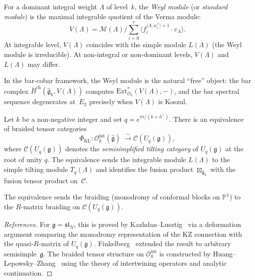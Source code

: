 \begin{definition}\label{def:weyl-module}
For a dominant integral weight $\Lambda$ of level~$k$, the
\emph{Weyl module} (or \emph{standard module}) is the maximal
integrable quotient of the Verma module:
\[
V(\Lambda) = \mathcal{M}(\Lambda) \Big/ \sum_{i=0}^r
\langle f_i^{\langle\Lambda, \alpha_i^\vee\rangle + 1}
\cdot v_\Lambda \rangle.
\]
At integrable level, $V(\Lambda)$ coincides with the simple module
$L(\Lambda)$ (the Weyl module is irreducible).  At non-integral or
non-dominant levels, $V(\Lambda)$ and $L(\Lambda)$ may differ.

In the bar-cobar framework, the Weyl module is the natural
``free'' object: the bar complex
$\bar{B}^{\mathrm{ch}}(\widehat{\mathfrak{g}}_k, V(\Lambda))$
computes $\mathrm{Ext}^*_{\mathcal{O}_k}(V(\Lambda), -)$, and the
bar spectral sequence degenerates at~$E_2$ precisely when
$V(\Lambda)$ is Koszul.
\end{definition}

\begin{theorem}
\label{thm:kazhdan-lusztig-equivalence}
Let $k$ be a non-negative integer and set
$q = e^{\pi i/(k + h^\vee)}$.  There is an equivalence of
braided tensor categories
\begin{equation}\label{eq:kl-equivalence}
\Phi_{\mathrm{KL}} \colon
\mathcal{O}_k^{\mathrm{int}}(\widehat{\mathfrak{g}})
\;\xrightarrow{\;\sim\;}
\mathcal{C}(U_q(\mathfrak{g})),
\end{equation}
where $\mathcal{C}(U_q(\mathfrak{g}))$ denotes the
\emph{semisimplified tilting category} of $U_q(\mathfrak{g})$
at the root of unity $q$.  The equivalence sends the integrable
module $L(\Lambda)$ to the simple tilting module
$T_q(\Lambda)$ and identifies the fusion product
$\boxtimes_{\widehat{\mathfrak{g}}_k}$ with the fusion tensor
product on~$\mathcal{C}$.

The equivalence sends the braiding
\textup{(}monodromy of conformal blocks on $\mathbb{P}^1$\textup{)}
to the $R$-matrix braiding on $\mathcal{C}(U_q(\mathfrak{g}))$.
\end{theorem}

\begin{proof}[References]
For $\mathfrak{g} = \mathfrak{sl}_N$, this is proved
by Kazhdan--Lusztig~\cite{KL93} via a deformation argument
comparing the monodromy representation of the KZ connection
with the quasi-$R$-matrix of $U_q(\mathfrak{g})$.
Finkelberg~\cite{Finkelberg96} extended the result to arbitrary
semisimple~$\mathfrak{g}$.  The braided tensor structure on
$\mathcal{O}_k^{\mathrm{int}}$ is constructed by
Huang--Lepowsky--Zhang~\cite{HLZ} using the theory of intertwining
operators and analytic continuation.
\end{proof}

